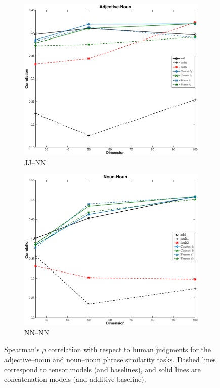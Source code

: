\documentclass[11pt]{article}
\begin{document}
\begin{figure}[t!]
	\begin{center}
	\begin{subfigure}{\columnwidth}
		\centering
		\includegraphics[width=\columnwidth,keepaspectratio=true]{./adj_nn.eps}	
		\caption{\small JJ--NN}
		\label{fig:jj_nn_result}			
	\end{subfigure}
	\begin{subfigure}{\columnwidth}
		\centering
		\includegraphics[width=\columnwidth,keepaspectratio=true]{./nn_nn.eps}		
		\caption {\small NN--NN}
		\label{fig:nn_nn_result}
	\end{subfigure}
	\end{center}
	\caption{Spearman's $\rho$ correlation with respect to human judgments for the adjective--noun and noun--noun phrase similarity tasks. Dashed lines correspond to tensor models (and baselines), and solid lines are concatenation models (and additive baseline).}
	\label{fig:correlation}
\end{figure}
\end{document}
